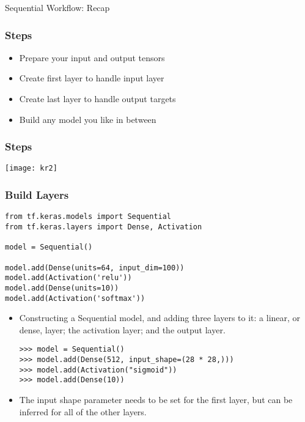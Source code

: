 \begin{frame}
  \begin{center}
    {\Large Sequential Workflow: Recap}
    
  \end{center}
\end{frame}
\begin{frame}[fragile] \frametitle{Steps}

\begin{itemize}
\item  Prepare your 
input and 
output tensors 
\item  Create first 
layer to handle 
input layer
\item  Create last 
layer to handle 
output targets
\item Build any 
model you like 
in between
\end{itemize}
\end{frame}

\begin{frame}[fragile] \frametitle{Steps}
\begin{center}
\texttt{[image: kr2]}
\end{center}
\end{frame}

\begin{frame}[fragile] \frametitle{Build Layers}
\begin{lstlisting}
from tf.keras.models import Sequential
from tf.keras.layers import Dense, Activation

model = Sequential()

model.add(Dense(units=64, input_dim=100))
model.add(Activation('relu'))
model.add(Dense(units=10))
model.add(Activation('softmax'))
\end{lstlisting}

\begin{itemize}
\item Constructing a Sequential model, and
adding three layers to it: a linear, or dense, layer;
the activation layer; and the output layer.
\begin{lstlisting}
>>> model = Sequential()
>>> model.add(Dense(512, input_shape=(28 * 28,)))
>>> model.add(Activation("sigmoid"))
>>> model.add(Dense(10))
\end{lstlisting}
\item The input shape parameter needs to be set for the
first layer, but can be inferred for all of the other
layers.
\end{itemize}
\end{frame}


